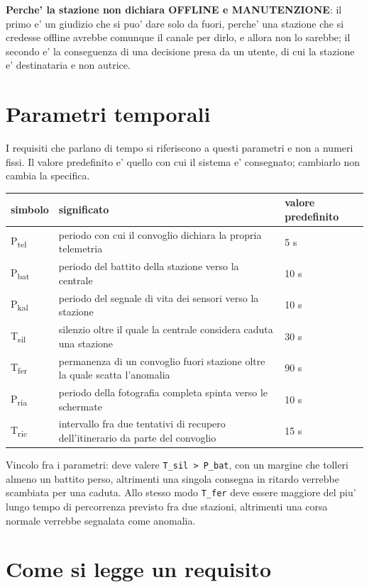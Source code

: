 \documentclass[11pt]{article}
\begin{document}
\textbf{Perche' la stazione non dichiara OFFLINE e MANUTENZIONE}: il primo e' un giudizio che si puo' dare
solo da fuori, perche' una stazione che si credesse offline avrebbe comunque il canale per dirlo, e
allora non lo sarebbe; il secondo e' la conseguenza di una decisione presa da un utente, di cui la
stazione e' destinataria e non autrice.
\section{Parametri temporali}
\label{sec:org3494386}

I requisiti che parlano di tempo si riferiscono a questi parametri e non a numeri fissi. Il valore
predefinito e' quello con cui il sistema e' consegnato; cambiarlo non cambia la specifica.

\begin{center}
\begin{tabular}{|p{}|p{}|p{}|}
simbolo & significato & valore predefinito\\
\hline
P\textsubscript{tel} & periodo con cui il convoglio dichiara la propria telemetria & 5 s\\
P\textsubscript{bat} & periodo del battito della stazione verso la centrale & 10 s\\
P\textsubscript{kal} & periodo del segnale di vita dei sensori verso la stazione & 10 s\\
T\textsubscript{sil} & silenzio oltre il quale la centrale considera caduta una stazione & 30 s\\
T\textsubscript{fer} & permanenza di un convoglio fuori stazione oltre la quale scatta l'anomalia & 90 s\\
P\textsubscript{ria} & periodo della fotografia completa spinta verso le schermate & 10 s\\
T\textsubscript{ric} & intervallo fra due tentativi di recupero dell'itinerario da parte del convoglio & 15 s\\
\end{tabular}
\end{center}

Vincolo fra i parametri: deve valere \texttt{T\_sil > P\_bat}, con un margine che tolleri almeno un battito
perso, altrimenti una singola consegna in ritardo verrebbe scambiata per una caduta. Allo stesso
modo \texttt{T\_fer} deve essere maggiore del piu' lungo tempo di percorrenza previsto fra due stazioni,
altrimenti una corsa normale verrebbe segnalata come anomalia.
\section{Come si legge un requisito}
\label{sec:org019e72a}
\end{document}
